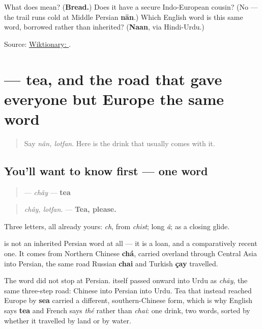 \begin{tcolorbox}[breakable,colback=teal!4,colframe=teal!35!black,title={Before you move on}]
What does \textbf{} mean? (\textbf{Bread.}) Does it have a secure Indo-European cousin? (No — the trail runs cold at Middle Persian \textbf{nān}.) Which English word is this same word, borrowed rather than inherited? (\textbf{Naan}, via Hindi-Urdu.)

Source: \href{https://en.wiktionary.org/wiki/\%D9\%86\%D8\%A7\%D9\%86}{Wiktionary: }.
\end{tcolorbox}
\section[\texorpdfstring{\fa{چای} (chây)}{چای (chây)}]{ — tea, and the road that gave everyone but Europe the same word}

\label{lesson:FA-C09-chay}



\begin{quote}
Say \emph{nân, lotfan}. Here is the drink that usually comes with it.
\end{quote}

\subsection*{You'll want to know first — one word}
\begin{quote}
\textbf{} — \emph{chây} — \textbf{tea}
\end{quote}

\begin{quote}
\emph{chây, lotfan.} — \textbf{Tea, please.}
\end{quote}

Three letters, all already yours: \textbf{} \emph{ch}, from \emph{chist}; long \textbf{} \emph{â}; \textbf{} as a closing glide.

\begin{cousinweb}
\textbf{} is not an inherited Persian word at all — it is a loan, and a comparatively recent one. It comes from Northern Chinese \textbf{chá}, carried overland through Central Asia into Persian, the same road Russian \textbf{chai} and Turkish \textbf{çay} travelled.

The word did not stop at Persian. \textbf{} itself passed onward into Urdu as \emph{chāy}, the same three-step road: Chinese into Persian into Urdu. Tea that instead reached Europe by \textbf{sea} carried a different, southern-Chinese form, which is why English says \textbf{tea} and French says \emph{thé} rather than \emph{chai}: one drink, two words, sorted by whether it travelled by land or by water.
\end{cousinweb}

